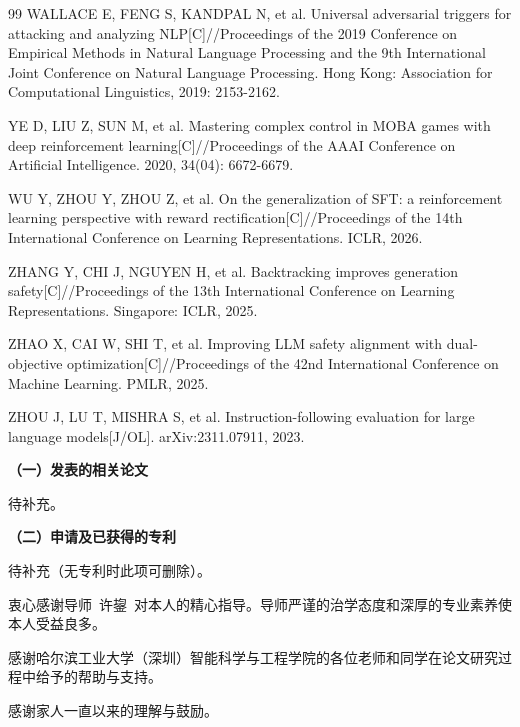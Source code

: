 \documentclass[fontset=fandol,type=master,campus=shenzhen,etitleauto=true]{hithesisbook}
\begin{document}
\begin{thebibliography}{99}
 WALLACE E, FENG S, KANDPAL N, et al. Universal adversarial triggers for attacking and analyzing NLP[C]//Proceedings of the 2019 Conference on Empirical Methods in Natural Language Processing and the 9th International Joint Conference on Natural Language Processing. Hong Kong: Association for Computational Linguistics, 2019: 2153-2162.

 YE D, LIU Z, SUN M, et al. Mastering complex control in MOBA games with deep reinforcement learning[C]//Proceedings of the AAAI Conference on Artificial Intelligence. 2020, 34(04): 6672-6679.

 WU Y, ZHOU Y, ZHOU Z, et al. On the generalization of SFT: a reinforcement learning perspective with reward rectification[C]//Proceedings of the 14th International Conference on Learning Representations. ICLR, 2026.

 ZHANG Y, CHI J, NGUYEN H, et al. Backtracking improves generation safety[C]//Proceedings of the 13th International Conference on Learning Representations. Singapore: ICLR, 2025.

 ZHAO X, CAI W, SHI T, et al. Improving LLM safety alignment with dual-objective optimization[C]//Proceedings of the 42nd International Conference on Machine Learning. PMLR, 2025.

 ZHOU J, LU T, MISHRA S, et al. Instruction-following evaluation for large language models[J/OL]. arXiv:2311.07911, 2023.

\end{thebibliography}

\begin{publication}
\noindent\textbf{（一）发表的相关论文}
\begin{publist}
\item 待补充。
\end{publist}

\noindent\textbf{（二）申请及已获得的专利}
\begin{publist}
\item 待补充（无专利时此项可删除）。
\end{publist}
\end{publication}

\authorization

\begin{acknowledgements}
衷心感谢导师~许鋆~对本人的精心指导。导师严谨的治学态度和深厚的专业素养使本人受益良多。

感谢哈尔滨工业大学（深圳）智能科学与工程学院的各位老师和同学在论文研究过程中给予的帮助与支持。

感谢家人一直以来的理解与鼓励。
\end{acknowledgements}
\end{document}

